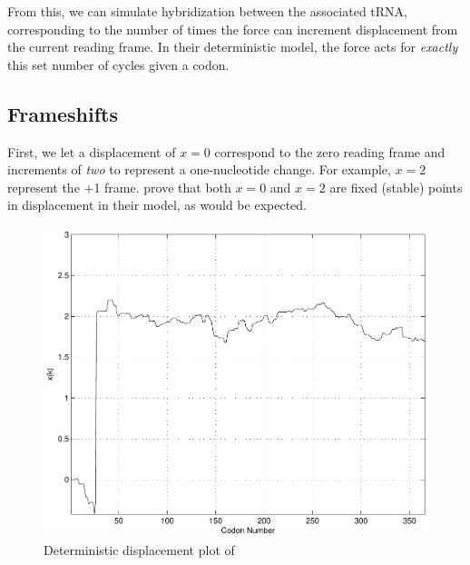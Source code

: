 \documentclass[12pt]{article}
\numberwithin{equation}{section}
\begin{document}
From this, we can simulate hybridization between the associated tRNA, corresponding to the number
of times the force can increment displacement from the current reading frame.
In their deterministic model, the force acts for \emph{exactly} this set number of cycles given a codon.

\subsection{Frameshifts}


First, we let a displacement of $x = 0$ correspond to the zero reading frame and increments of
\emph{two} to represent a one-nucleotide change. For example, $x =2$ represent the +1 frame.
\citet{lalit:embs} prove that both $x = 0$ and $x = 2$ are fixed (stable) points in displacement in their model,
as would be expected.

\begin{figure}
  \centering
  \caption{Deterministic displacement plot of~\prfB}
  \label{prfB:deterministic}
  \includegraphics[scale=0.4]{prfB/deterministic}
\end{figure}
\end{document}
